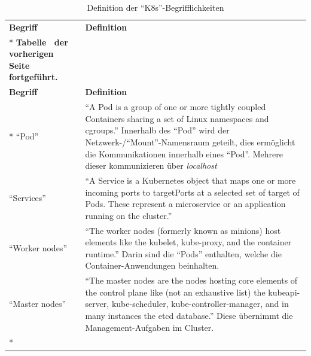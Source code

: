 \begin{longtable}[c]{@{}lp{12.0cm}@{}}
	\toprule[1.5pt]
	\textbf{Begriff} & \textbf{Definition} \\* \midrule
	\endfirsthead
	\multicolumn{2}{c}%
	{{\bfseries Tabelle \thetable\ der vorherigen Seite fortgeführt.}} \\
	\toprule
	\textbf{Begriff} & \textbf{Definition} \\* \midrule
	\endhead
	\bottomrule
	\endfoot
	\endlastfoot
	\enquote{Pod}              & \enquote{A Pod is a group of one or more tightly coupled Containers sharing a set of Linux namespaces and cgroups.} Innerhalb des \enquote{Pod} wird der Netzwerk-/\enquote{Mount}-Namensraum geteilt, dies ermöglicht die Kommunikationen innerhalb eines \enquote{Pod}. Mehrere dieser kommunizieren über \textit{localhost} \\
	\enquote{Services}         & \enquote{A Service is a Kubernetes object that maps one or more incoming ports to targetPorts at a selected set of target of Pods. These represent a microservice or an application running on the cluster.} \\
	\enquote{Worker nodes}     & \enquote{The worker nodes (formerly known as minions) host elements like the kubelet, kube-proxy, and the container runtime.} Darin sind die \enquote{Pods} enthalten, welche die Container-Anwendungen beinhalten. \\
	\enquote{Master nodes}     & \enquote{The master nodes are the nodes hosting core elements of the control plane like (not an exhaustive list) the kubeapi-server, kube-scheduler, kube-controller-manager, and in many	instances the etcd database.} Diese übernimmt die Management-Aufgaben im Cluster. \\* \bottomrule
	
		
	\caption{Definition der \enquote{\ac{K8s}}-Begrifflichkeiten}\label{tab:definitionenK8s}\\
\end{longtable}


